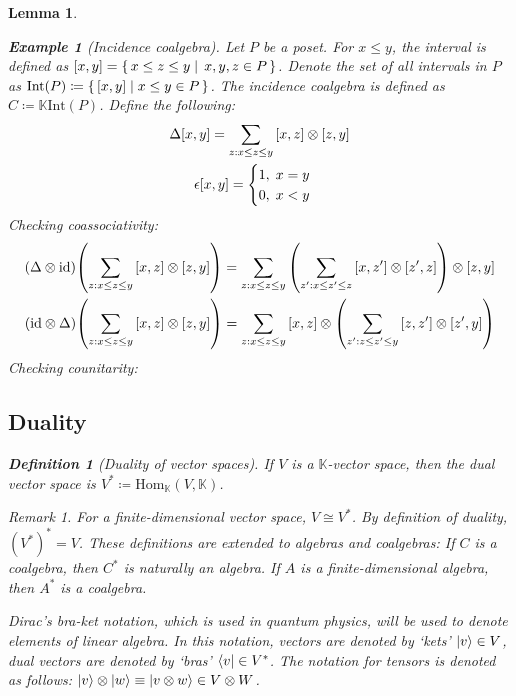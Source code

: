 \documentclass{article}
\newtheorem{Lemma}{Lemma}
\theoremstyle{definition}
\newtheorem{Definition}{Definition}
\newtheorem{Example}{Example}
\theoremstyle{remark}
\newtheorem*{Remark*}{Remark}
\theoremstyle{underline}
\theoremstyle{underline}
\newcommand{\id}{\mathrm{id}}
\newcommand{\Hom}{\mathrm{Hom}}
\begin{document}
\begin{Lemma}
	\begin{Example}[Incidence coalgebra]
		Let $P$ be a poset. For $x \leq y$, the \emph{interval} is defined as $\bqty{x,y} = \qty{\, x \leq z \leq y \mid \, x,y,z \in P \,}$. Denote the set of all intervals in $P$ as $\mathrm{Int}(P) \coloneqq \qty{\, \bqty{x,y} \mid x \leq y \in P \,}$. The \emph{incidence coalgebra} is defined as $C \coloneqq \mathbb K \mathrm{Int}(P)$. Define the following:
		\begin{gather*}
			\Delta\bqty{x,y} = \sum_{z: x \leq z \leq y} \bqty{x,z} \otimes \bqty{z,y} \\
			\epsilon{\bqty{x,y}} =
			\begin{cases}
				1, \; x = y \\
				0, \; x < y
			\end{cases}
		\end{gather*}
		Checking coassociativity:
		\begin{gather*}
			\pqty{\Delta \otimes \id}\pqty{\sum_{z: x \leq z \leq y} \bqty{x,z} \otimes \bqty{z,y}} = \sum_{z: x \leq z \leq y}\pqty{\sum_{z': x \leq z' \leq z} \bqty{x,z'} \otimes \bqty{z',z}} \otimes \bqty{z,y} \\
			\pqty{\id \otimes \Delta}\pqty{\sum_{z: x \leq z \leq y} \bqty{x,z} \otimes \bqty{z,y}} = \sum_{z: x \leq z \leq y} \bqty{x,z} \otimes \pqty{\sum_{z': z \leq z' \leq y} \bqty{z,z'} \otimes \bqty{z',y}}
		\end{gather*}
		Checking counitarity:
	\end{Example}

	\subsection{Duality}

	\begin{Definition}[Duality of vector spaces]
		If $V$ is a $\mathbb K$-vector space, then the dual vector space is $V^* \coloneqq \Hom_{\mathbb K}(V, \mathbb K)$.
	\end{Definition}

	\begin{Remark*}
		For a finite-dimensional vector space, $V\cong V^*$. By definition of duality, $(V^*)^* = V$. These definitions are extended to algebras and coalgebras:
		If $C$ is a coalgebra, then $C^*$ is naturally an algebra. If $A$ is a \emph{finite-dimensional} algebra, then $A^*$ is a coalgebra.
	\end{Remark*}

	Dirac's bra-ket notation, which is used in quantum physics, will be used to denote elements of linear algebra. In this notation, vectors are denoted by `\emph{kets}' $\ket{v} \in V$, dual vectors are denoted by `\emph{bras}' $\bra{v} \in V^* $. The notation for tensors is denoted as follows: $\ket{v} \otimes \ket{w} \equiv \ket{v \otimes w} \in V \otimes W$.


\end{Lemma}
\end{document}
